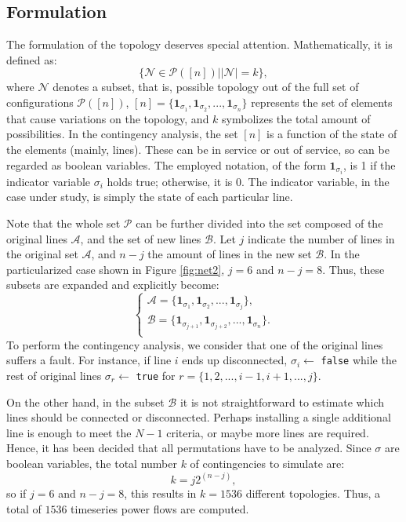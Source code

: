 \subsection{Formulation}
The formulation of the topology deserves special attention. Mathematically, it is defined as:
\begin{equation}
  \{\mathcal{N} \in \mathcal{P}([n]) \left. \right\vert |\mathcal{N}|=k \},
\end{equation}
where $\mathcal{N}$ denotes a subset, that is, possible topology out of the full set of configurations $\mathcal{P}([n])$, $[n] = \{\mathbf{1}_{\sigma_1},\mathbf{1}_{\sigma_2},...,\mathbf{1}_{\sigma_n}\}$ represents the set of elements that cause variations on the topology, and $k$ symbolizes the total amount of possibilities. In the contingency analysis, the set $[n]$ is a function of the state of the elements (mainly, lines). These can be in service or out of service, so can be regarded as boolean variables. The employed notation, of the form $\mathbf{1}_{\sigma_i}$, is 1 if the indicator variable $\sigma_i$ holds true; otherwise, it is 0. The indicator variable, in the case under study, is simply the state of each particular line.

Note that the whole set $\mathcal{P}$ can be further divided into the set composed of the original lines $\mathcal{A}$, and the set of new lines $\mathcal{B}$. Let $j$ indicate the number of lines in the original set $\mathcal{A}$, and $n-j$ the amount of lines in the new set $\mathcal{B}$. In the particularized case shown in Figure \ref{fig:net2}, $j=6$ and $n-j=8$. Thus, these subsets are expanded and explicitly become:
\begin{equation}
  \begin{cases}
  \mathcal{A} = \{\mathbf{1}_{\sigma_{1}}, \mathbf{1}_{\sigma_{2}},..., \mathbf{1}_{\sigma_{j}}\}, \\
  \mathcal{B} = \{\mathbf{1}_{\sigma_{j+1}}, \mathbf{1}_{\sigma_{j+2}},..., \mathbf{1}_{\sigma_{n}}\}. \\
\end{cases}
\end{equation}
To perform the contingency analysis, we consider that one of the original lines suffers a fault. For instance, if line $i$ ends up disconnected, $\sigma_i\gets$ \texttt{false} while the rest of original lines $\sigma_r\gets$ \texttt{true} for $r=\{1,2,...,i-1,i+1,...,j\}$.

On the other hand, in the subset $\mathcal{B}$ it is not straightforward to estimate which lines should be connected or disconnected. Perhaps installing a single additional line is enough to meet the $N-1$ criteria, or maybe more lines are required. Hence, it has been decided that all permutations have to be analyzed. Since $\sigma$ are boolean variables, the total number $k$ of contingencies to simulate are:
\begin{equation}
  k = j 2^{(n-j)},
\end{equation}
so if $j=6$ and $n-j=8$, this results in $k=1536$ different topologies. Thus, a total of $1536$ timeseries power flows are computed. 

